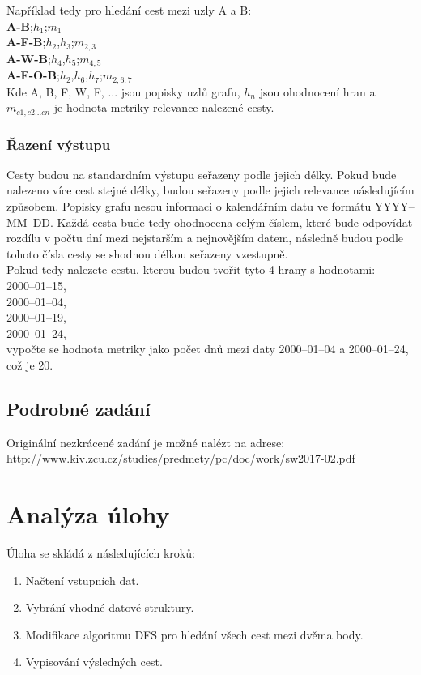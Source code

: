 \documentclass[
12pt,
a4paper,
pdftex,
czech,
titlepage
]{report}
\begin{document}
Například tedy pro hledání cest mezi uzly A a B:\\

\textbf{A-B};$h_{1}$;$m_{1}$\\
\textbf{A-F-B};$h_{2}$,$h_{3}$;$m_{2,3}$\\
\textbf{A-W-B};$h_{4}$,$h_{5}$;$m_{4,5}$\\
\textbf{A-F-O-B};$h_{2}$,$h_{6}$,$h_{7}$;$m_{2,6,7}$\\


Kde A, B, F, W, F, ... jsou popisky uzlů grafu, $h_{n}$ jsou ohodnocení hran a $m_{c1,c2...cn}$ je hodnota metriky relevance nalezené cesty.

\subsection{Řazení výstupu}
Cesty budou na standardním výstupu seřazeny podle jejich délky. Pokud bude nalezeno více cest stejné délky, budou seřazeny podle jejich relevance následujícím způsobem. Popisky grafu nesou informaci o kalendářním datu ve formátu YYYY--MM--DD. Každá cesta bude tedy ohodnocena celým číslem, které bude odpovídat rozdílu v počtu dní mezi nejstarším a nejnovějším datem, následně budou podle tohoto čísla cesty se shodnou délkou seřazeny vzestupně.\\


\newpage
Pokud tedy nalezete cestu, kterou budou tvořit tyto 4 hrany s hodnotami:\\

2000--01--15,\\
2000--01--04,\\
2000--01--19,\\
2000--01--24,\\

vypočte se hodnota metriky jako počet dnů mezi daty 2000--01--04 a 2000--01--24, což je 20.

\section{Podrobné zadání}
Originální nezkrácené zadání je možné nalézt na adrese:\\

http://www.kiv.zcu.cz/studies/predmety/pc/doc/work/sw2017-02.pdf

\setcounter{page}{1}

\chapter{Analýza úlohy}
Úloha se skládá z následujících kroků:
\begin{enumerate}
	\item Načtení vstupních dat.
	\item Vybrání vhodné datové struktury.
	\item Modifikace algoritmu DFS pro hledání všech cest mezi dvěma body.
	\item Vypisování výsledných cest.
\end{enumerate}
\end{document}
